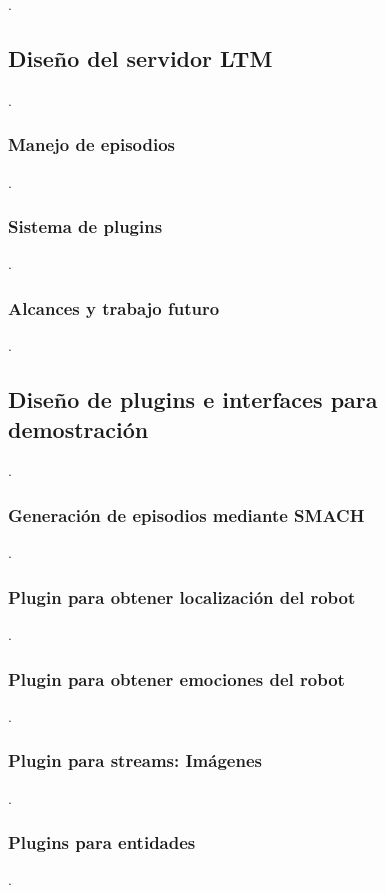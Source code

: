  .

\subsection{Diseño del servidor LTM}
 .

\subsubsection{Manejo de episodios}
 .

\subsubsection{Sistema de plugins}
 .

\subsubsection{Alcances y trabajo futuro}
 .

\subsection{Diseño de plugins e interfaces para demostración}
 .

\subsubsection{Generación de episodios mediante SMACH}
 .

\subsubsection{Plugin para obtener localización del robot}
 .

\subsubsection{Plugin para obtener emociones del robot}
 .

\subsubsection{Plugin para streams: Imágenes}
 .

\subsubsection{Plugins para entidades}
 .

